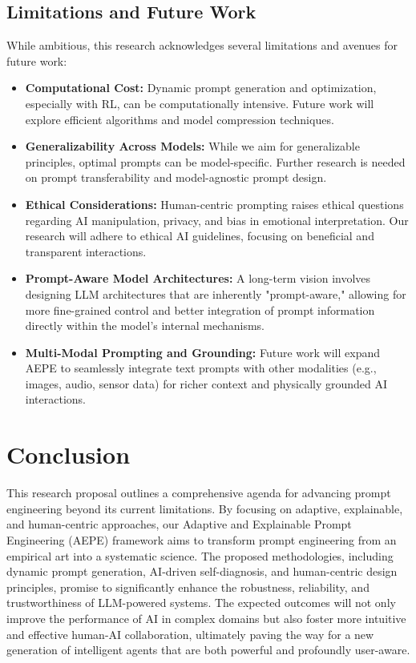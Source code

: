 \documentclass{article}
\begin{document}
\subsection{Limitations and Future Work}
While ambitious, this research acknowledges several limitations and avenues for future work:
\begin{itemize}
    \item \textbf{Computational Cost:} Dynamic prompt generation and optimization, especially with RL, can be computationally intensive. Future work will explore efficient algorithms and model compression techniques.
    \item \textbf{Generalizability Across Models:} While we aim for generalizable principles, optimal prompts can be model-specific. Further research is needed on prompt transferability and model-agnostic prompt design.
    \item \textbf{Ethical Considerations:} Human-centric prompting raises ethical questions regarding AI manipulation, privacy, and bias in emotional interpretation. Our research will adhere to ethical AI guidelines, focusing on beneficial and transparent interactions.
    \item \textbf{Prompt-Aware Model Architectures:} A long-term vision involves designing LLM architectures that are inherently "prompt-aware," allowing for more fine-grained control and better integration of prompt information directly within the model's internal mechanisms.
    \item \textbf{Multi-Modal Prompting and Grounding:} Future work will expand AEPE to seamlessly integrate text prompts with other modalities (e.g., images, audio, sensor data) for richer context and physically grounded AI interactions.
\end{itemize}

\section{Conclusion}
This research proposal outlines a comprehensive agenda for advancing prompt engineering beyond its current limitations. By focusing on adaptive, explainable, and human-centric approaches, our Adaptive and Explainable Prompt Engineering (AEPE) framework aims to transform prompt engineering from an empirical art into a systematic science. The proposed methodologies, including dynamic prompt generation, AI-driven self-diagnosis, and human-centric design principles, promise to significantly enhance the robustness, reliability, and trustworthiness of LLM-powered systems. The expected outcomes will not only improve the performance of AI in complex domains but also foster more intuitive and effective human-AI collaboration, ultimately paving the way for a new generation of intelligent agents that are both powerful and profoundly user-aware.
\end{document}
